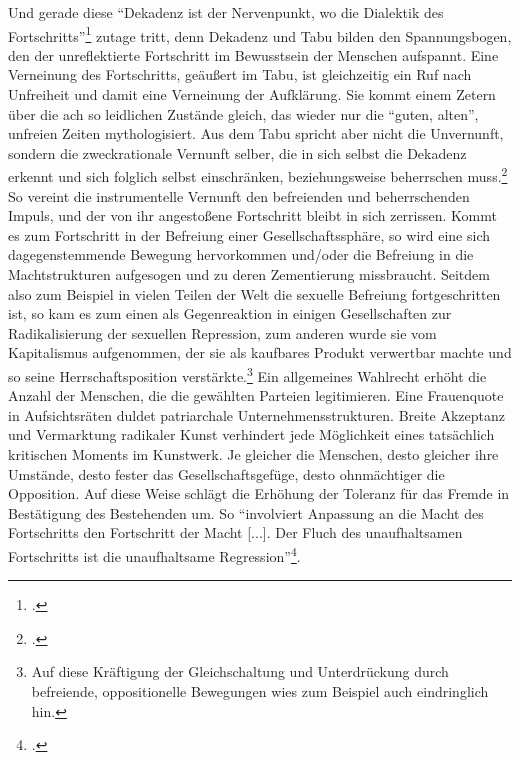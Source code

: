 \documentclass[a4paper, 12pt]{article}
\begin{document}
\begin{onehalfspace}
Und gerade diese "`Dekadenz ist der Nervenpunkt, wo die Dialektik des Fortschritts"'\footnote{\Cite[Siehe][S. 627]{fortschritt}.} zutage tritt, denn Dekadenz und Tabu bilden den Spannungsbogen, den der unreflektierte Fortschritt im Bewusstsein der Menschen aufspannt. Eine Verneinung des Fortschritts, geäußert im Tabu, ist gleichzeitig ein Ruf nach Unfreiheit und damit eine Verneinung der Aufklärung. Sie kommt einem Zetern über die ach so leidlichen Zustände gleich, das wieder nur die "`guten, alten"', unfreien Zeiten mythologisiert. Aus dem Tabu spricht aber nicht die Unvernunft, sondern die zweckrationale Vernunft selber, die in sich selbst die Dekadenz erkennt und sich folglich selbst einschränken, beziehungsweise beherrschen muss.\footnote{\Cite[Vgl.][S. 628]{fortschritt}.} So vereint die instrumentelle Vernunft den befreienden und beherrschenden Impuls, und der von ihr angestoßene Fortschritt bleibt in sich zerrissen. Kommt es zum Fortschritt in der Befreiung einer Gesellschaftssphäre, so wird eine sich da­ge­gen­stem­mende Bewegung hervorkommen und/oder die Befreiung in die Machtstrukturen aufgesogen und zu deren Zementierung missbraucht. Seitdem also zum Beispiel in vielen Teilen der Welt die sexuelle Befreiung fortgeschritten ist, so kam es zum einen als Gegenreaktion in einigen Gesellschaften zur Radikalisierung der sexuellen Repression, zum anderen wurde sie vom Kapitalismus aufgenommen, der sie als kaufbares Produkt verwertbar machte und so seine Herrschaftsposition verstärkte.\footnote{Auf diese Kräftigung der Gleichschaltung und Unterdrückung durch befreiende, oppositionelle Bewegungen wies zum Beispiel auch \citet{marcuse} eindringlich hin.} Ein allgemeines Wahlrecht erhöht die Anzahl der Menschen, die die gewählten Parteien legitimieren. Eine Frauenquote in Aufsichtsräten duldet patriarchale Unternehmensstrukturen. Breite Akzeptanz und Vermarktung radikaler Kunst verhindert jede Möglichkeit eines tatsächlich kritischen Moments im Kunstwerk. Je gleicher die Menschen, desto gleicher ihre Umstände, desto fester das Gesellschaftsgefüge, desto ohnmächtiger die Opposition. Auf diese Weise schlägt die Erhöhung der Toleranz für das Fremde in Bestätigung des Bestehenden um. So "`involviert Anpassung an die Macht des Fortschritts den Fortschritt der Macht [...]. Der Fluch des unaufhaltsamen Fortschritts ist die unaufhaltsame Regression"'\footnote{\Cite[Siehe][S. 42]{dialektik-der-aufklaerung}.}.


\end{onehalfspace}
\end{document}
